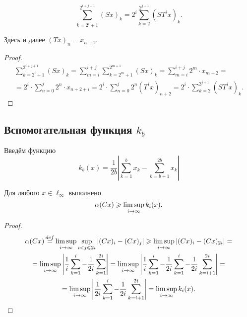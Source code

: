 \begin{lemma}
	\begin{equation}\label{summa_S}
		\sum_{k=2^i+1}^{2^{i+j+1}} (Sx)_k =
		2^i\sum_{k=2}^{2^{j+1}} (ST^ix)_k
		.
	\end{equation}

	Здесь и далее $(Tx)_n = x_{n+1}$.
\end{lemma}

\begin{proof}
	\begin{multline*}
		\sum_{k=2^i+1}^{2^{i+j+1}} (Sx)_k =
		\sum_{m = i}^{i+j}\sum_{k=2^m+1}^{2^{m+1}} (Sx)_k =
		\sum_{m = i}^{i+j}2^m \cdot x_{m+2} =
		\\=
		2^i \cdot \sum_{n = 0}^{j}2^n \cdot x_{n+2+i} =
		2^i \cdot \sum_{n = 0}^{j}2^n (T^i x)_{n+2} =
		2^i \cdot \sum_{k=2}^{2^{j+1}} (ST^i x)_k
		.
	\end{multline*}
\end{proof}

\subsection{Вспомогательная функция $k_b$}

Введём функцию
\begin{equation}\label{def_k_b}
	k_b(x) = \frac{1}{2b}\left|
		\sum_{k=1}^{b}x_k - \sum_{k=b+1}^{2b}x_k
	\right|
\end{equation}

\begin{lemma}
	Для любого $x\in\ell_\infty$ выполнено
	\begin{equation}\label{alpha_greater_k_b}
		\alpha (Cx) \geq \varlimsup_{i\to \infty} k_i(x)
		.
	\end{equation}
\end{lemma}

\begin{proof}
	\begin{multline*}
		\alpha (Cx) \mathop{=}\limits^{def}
		\varlimsup_{i\to \infty} \sup_{i<j\leq 2i} |(Cx)_i - (Cx)_j| \geq
		\varlimsup_{i\to \infty} |(Cx)_i - (Cx)_{2i}| =
		\\ =
		\varlimsup_{i\to \infty} \left|\frac{1}{i}\sum_{k=1}^i  - \frac{1}{2i}\sum_{k=1}^{2i} \right| =
		\varlimsup_{i\to \infty} \left|\frac{1}{i}\sum_{k=1}^i  - \frac{1}{2i}\sum_{k=1}^{i}- \frac{1}{2i}\sum_{k=i+1}^{2i}\right| =
		\\=
		\varlimsup_{i\to \infty} \left|\frac{1}{2i}\sum_{k=1}^i - \frac{1}{2i}\sum_{k=i+1}^{2i}\right| =
		\varlimsup_{i\to \infty} k_i(x)
		.
	\end{multline*}
\end{proof}

